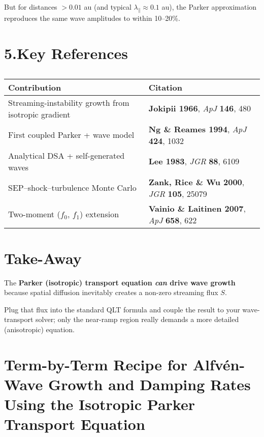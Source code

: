 \noindent
But for distances $>0.01$ au (and typical $\lambda_\parallel \approx 0.1$ au), the Parker approximation reproduces the same wave amplitudes to within 10--20\%.

\section*{5.\quad Key References}

\begin{table}[h!]
\centering
\begin{tabular}{|p{8cm}|p{5cm}|}
\hline
\textbf{Contribution} & \textbf{Citation} \\
\hline
Streaming-instability growth from isotropic gradient & \textbf{Jokipii 1966}, \textit{ApJ} \textbf{146}, 480 \\
\hline
First coupled Parker + wave model & \textbf{Ng \& Reames 1994}, \textit{ApJ} \textbf{424}, 1032 \\
\hline
Analytical DSA + self-generated waves & \textbf{Lee 1983}, \textit{JGR} \textbf{88}, 6109 \\
\hline
SEP–shock–turbulence Monte Carlo & \textbf{Zank, Rice \& Wu 2000}, \textit{JGR} \textbf{105}, 25079 \\
\hline
Two-moment ($f_0$, $f_1$) extension & \textbf{Vainio \& Laitinen 2007}, \textit{ApJ} \textbf{658}, 622 \\
\hline
\end{tabular}
\caption*{}
\end{table}

\section*{Take-Away}

\noindent
The \textbf{Parker (isotropic) transport equation \textit{can} drive wave growth} because spatial diffusion inevitably creates a non-zero streaming flux $S$. 

\noindent
Plug that flux into the standard QLT formula and couple the result to your wave-transport solver; only the near-ramp region really demands a more detailed (anisotropic) equation.



\section*{Term-by-Term Recipe for Alfvén-Wave Growth and Damping Rates Using the Isotropic Parker Transport Equation}

